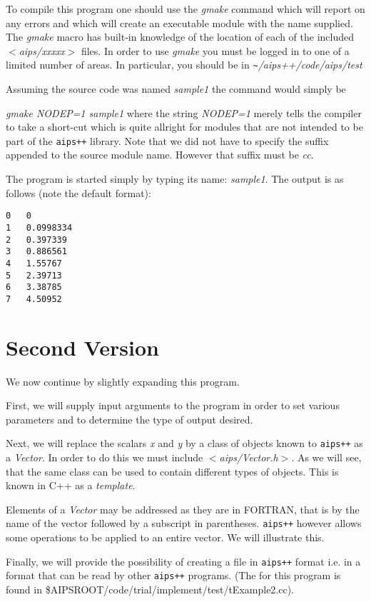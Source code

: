 To compile this program one should use the {\em gmake} command which
will report on any errors and which will create an executable module
with the name supplied.  The {\em gmake} macro has built-in knowledge
of the location of each of the included {\em $<$aips/xxxxx$>$} files. 
In order to use {\em gmake}  you must be logged in to one of
a limited number of areas. In particular, you should be in 
{\em \verb+~+/aips++/code/aips/test}


	Assuming the source code was named {\em sample1}
the command would simply be 

{\em gmake NODEP=1 sample1} where the string {\em NODEP=1} merely tells the
compiler to take a short-cut which is quite allright for modules that are not
intended to be part of the {\tt aips++} library.
Note that we did not have to specify the suffix appended to the source
module name. However that suffix must be {\em cc}.

The program is started simply by typing its name: {\em sample1}.  
The output is as follows (note the default format):
\begin{verbatim}
0	0
1	0.0998334
2	0.397339
3	0.886561
4	1.55767
5	2.39713
6	3.38785
7	4.50952
\end{verbatim}
 
\newpage


\section{Second Version}

        We now continue by slightly expanding this program.

First, we will supply input arguments to the program in order to set
various parameters and to determine the type of output desired.

Next, we will replace the scalars {\em x} and {\em y} by a 
class of objects known to {\tt aips++} as a {\em Vector}.  In order to do
this we must include {\em $<$aips/Vector.h$>$}.
As we will see, that the same class can be used to contain different
types of objects. This is known in C++ as a {\em template}.

Elements of a {\em Vector} may be addressed as they are in FORTRAN, that is
by the name of the vector followed by a subscript in parentheses.  {\tt aips++}
however allows some operations to be applied to an entire vector. We will
illustrate this.

Finally, we will provide the possibility of creating
a file in {\tt aips++} format i.e. in a format that can be read by other
{\tt aips++} programs. 
(The 
for this program is found in 
\$AIPSROOT/code/trial/implement/test/tExample2.cc). 


